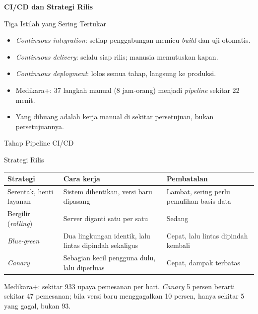 \documentclass[aspectratio=169, table, 12pt]{beamer}
\begin{document}
\begin{frame}{\hfill}
  \centering
  \Huge{\textbf{CI/CD dan Strategi Rilis}}
\end{frame}

\begin{frame}{{\Large Tiga Istilah yang Sering Tertukar}}
  \vspace{10pt}
  \begin{itemize}
    \item \textit{Continuous integration}: setiap penggabungan memicu \textit{build} dan uji
          otomatis.
    \item \textit{Continuous delivery}: selalu siap rilis; manusia memutuskan kapan.
    \item \textit{Continuous deployment}: lolos semua tahap, langsung ke produksi.
    \item Medikara+: 37 langkah manual (8 jam-orang) menjadi \textit{pipeline} sekitar 22 menit.
    \item Yang dibuang adalah kerja manual di sekitar persetujuan, bukan persetujuannya.
  \end{itemize}
\end{frame}

\begin{frame}{{\Large Tahap Pipeline CI/CD}}
  \centering
\end{frame}

\begin{frame}{{\Large Strategi Rilis}}
  \footnotesize
  \begin{tabularx}{\textwidth}{>{\raggedright\arraybackslash}p{3.2cm}
      >{\raggedright\arraybackslash}X >{\raggedright\arraybackslash}p{3.4cm}}
    \hline
    \textbf{Strategi} & \textbf{Cara kerja} & \textbf{Pembatalan} \\
    \hline
    Serentak, henti layanan & Sistem dihentikan, versi baru dipasang & Lambat, sering perlu
      pemulihan basis data \\
    \hline
    Bergilir (\textit{rolling}) & Server diganti satu per satu & Sedang \\
    \hline
    \textit{Blue-green} & Dua lingkungan identik, lalu lintas dipindah sekaligus & Cepat,
      lalu lintas dipindah kembali \\
    \hline
    \textit{Canary} & Sebagian kecil pengguna dulu, lalu diperluas & Cepat, dampak terbatas \\
    \hline
  \end{tabularx}

  \vspace{8pt}
  \small Medikara+: sekitar 933 upaya pemesanan per hari. \textit{Canary} 5 persen berarti
  sekitar 47 pemesanan; bila versi baru menggagalkan 10 persen, hanya sekitar 5 yang gagal, bukan 93.
\end{frame}
\end{document}

